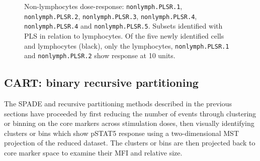 \begin{figure}
\begin{minipage}{.5\textwidth}
\end{minipage}
\begin{minipage}{.3\textwidth}
{ Non-lymphocytes dose-response: \texttt{nonlymph.PLSR.1}, \texttt{nonlymph.PLSR.2}, \texttt{nonlymph.PLSR.3}, \texttt{nonlymph.PLSR.4}, \texttt{nonlymph.PLSR.4} and \texttt{nonlymph.PLSR.5}. }
{
    Subsets identified with \gls{PLS} in relation to lymphocytes.
    Of the five newly identified cells and lymphocytes (black), only the lymphocytes, \texttt{nonlymph.PLSR.1} and \texttt{nonlymph.PLSR.2} show response at 10 units.
} 
\end{minipage}
\end{figure}

\subsection{CART: binary recursive partitioning}

The \gls{SPADE} and recursive partitioning methods described in the previous sections have proceeded by first reducing the number of events through clustering or binning
on the core markers across stimulation doses, then visually identifying clusters or bins which show pSTAT5 response using a two-dimensional \gls{MST} projection
of the reduced dataset. The clusters or bins are then projected back to core marker space to examine their MFI and relative size.

